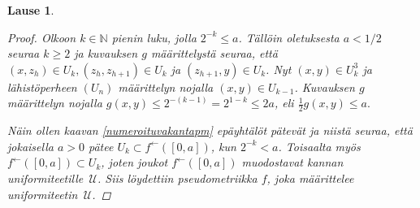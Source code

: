 \documentclass[12pt,a4paper,leqno]{report}
\newcommand{\N}{\mathbb{N}}
\newcommand{\U}{\,\mathcal{U}}
\theoremstyle{plain}
\newtheorem{lause}[equation]{Lause}
\newtheorem{kor}[equation]{Korollaari}
\theoremstyle{definition}
\theoremstyle{remark}
\begin{document}
\begin{lause}
\begin{proof}
Olkoon $k\in \N$ pienin luku, jolla $2^{-k}\leq a$. 
Tällöin oletuksesta $a<1/2$ seuraa $k\geq 2$ ja kuvauksen $g$ määrittelystä seuraa, että 
$(x,z_h)\in U_k,(z_h,z_{h+1})\in U_k$ ja $(z_{h+1},y)\in U_k$. 
Nyt 
$(x,y)\in U_k^3$ ja 
lähistöperheen $(U_n)$ määrittelyn nojalla $ (x,y)\in U_{k-1}$. 
Kuvauksen $g$ määrittelyn nojalla 
$g(x,y)\leq 2^{-(k-1)}=2^{1-k}\leq 2a$, eli $\frac{1}{2}g(x,y)\leq a.$ 

Näin ollen kaavan \ref{numeroituvakantapm} epäyhtälöt pätevät ja 
niistä seuraa, että jokaisella $a>0$ pätee 
$U_k\subset f^\leftarrow([0,a])$, kun $2^{-k}<a$. 
Toisaalta myös $f^\leftarrow([0,a])\subset U_k$, 
joten joukot $f^\leftarrow([0,a])$ muodostavat kannan uniformiteetille $\U$. 
Siis löydettiin pseudometriikka $f$, joka määrittelee uniformiteetin $\U$.
\end{proof}
\end{lause}
%
%
\end{document}

